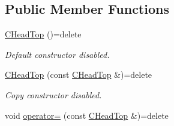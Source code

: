 \subsection*{Public Member Functions}
\begin{DoxyCompactItemize}
\item 
\hyperlink{class_c_head_top_a54fab18f42f367ff9cfdf73537ada62f}{C\+Head\+Top} ()=delete
\begin{DoxyCompactList}\small\item\em Default constructor disabled. \end{DoxyCompactList}\item 
\hypertarget{class_c_head_top_a574b5950dff9f90de01219437f475cb9}{\hyperlink{class_c_head_top_a574b5950dff9f90de01219437f475cb9}{C\+Head\+Top} (const \hyperlink{class_c_head_top}{C\+Head\+Top} \&)=delete}\label{class_c_head_top_a574b5950dff9f90de01219437f475cb9}

\begin{DoxyCompactList}\small\item\em Copy constructor disabled. \end{DoxyCompactList}\item 
\hypertarget{class_c_head_top_aeb3522f283f90cb48b7b6a7ed6243aeb}{void \hyperlink{class_c_head_top_aeb3522f283f90cb48b7b6a7ed6243aeb}{operator=} (const \hyperlink{class_c_head_top}{C\+Head\+Top} \&)=delete}\label{class_c_head_top_aeb3522f283f90cb48b7b6a7ed6243aeb}


\end{DoxyCompactItemize}
